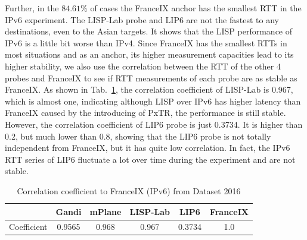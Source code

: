 Further, in the $84.61\%$ of cases the FranceIX anchor has the smallest RTT in the IPv6 experiment. The LISP-Lab probe and LIP6 are not the fastest to any destinations, even to the Asian targets. It shows that the LISP performance of IPv6 is a little bit worse than IPv4. Since FranceIX has the smallest RTTs in most situations and as an anchor, its higher measurement capacities lead to its higher stability, we also use the correlation between the RTT of the other 4 probes and FranceIX to see if RTT measurements of each probe are as stable as FranceIX. As shown in Tab.~\ref{correlation_v6_2016}, the correlation coefficient of LISP-Lab is 0.967, which is almost one, indicating although LISP over IPv6 has higher latency than FranceIX caused by the introducing of PxTR, the performance is still stable. However, the correlation coefficient of LIP6 probe is just 0.3734. It is higher than 0.2, but much lower than 0.8, showing that the LIP6 probe is not totally independent from FranceIX, but it has quite low correlation. In fact, the IPv6 RTT series of LIP6 fluctuate a lot over time during the experiment and are not stable.

%
\begin{table}[!tb]
	\centering
	\caption{Correlation coefficient to FranceIX (IPv6) from Dataset 2016}
	\label{correlation_v6_2016}{
		\begin{tabular}{@{}c|c|c|c|c|c@{}}
			\hline\hline
			& Gandi  & mPlane  & LISP-Lab  & LIP6 &  FranceIX \\ \hline
			Coefficient &  0.9565 & 0.968 & 0.967 & 0.3734 & 1.0     	\\  \hline\hline                 
		\end{tabular}
	}
\end{table}

